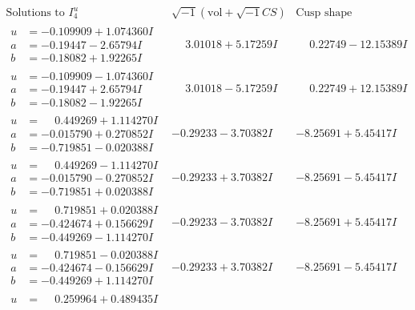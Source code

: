 \documentclass[1p]{elsarticle_modified}
\theoremstyle{definition}
\newcommand{\I}{\sqrt{-1}}
\begin{document}
$$\begin{array}{c|c|c}  
\text{Solutions to }I^u_{4}& \I (\text{vol} + \sqrt{-1}CS) & \text{Cusp shape}\\
 \hline 
\begin{aligned}
u &= -0.109909 + 1.074360 I \\
a &= -0.19447 - 2.65794 I \\
b &= -0.18082 + 1.92265 I\end{aligned}
 & \phantom{-}3.01018 + 5.17259 I & \phantom{-}0.22749 - 12.15389 I \\ \hline\begin{aligned}
u &= -0.109909 - 1.074360 I \\
a &= -0.19447 + 2.65794 I \\
b &= -0.18082 - 1.92265 I\end{aligned}
 & \phantom{-}3.01018 - 5.17259 I & \phantom{-}0.22749 + 12.15389 I \\ \hline\begin{aligned}
u &= \phantom{-}0.449269 + 1.114270 I \\
a &= -0.015790 + 0.270852 I \\
b &= -0.719851 - 0.020388 I\end{aligned}
 & -0.29233 - 3.70382 I & -8.25691 + 5.45417 I \\ \hline\begin{aligned}
u &= \phantom{-}0.449269 - 1.114270 I \\
a &= -0.015790 - 0.270852 I \\
b &= -0.719851 + 0.020388 I\end{aligned}
 & -0.29233 + 3.70382 I & -8.25691 - 5.45417 I \\ \hline\begin{aligned}
u &= \phantom{-}0.719851 + 0.020388 I \\
a &= -0.424674 + 0.156629 I \\
b &= -0.449269 - 1.114270 I\end{aligned}
 & -0.29233 - 3.70382 I & -8.25691 + 5.45417 I \\ \hline\begin{aligned}
u &= \phantom{-}0.719851 - 0.020388 I \\
a &= -0.424674 - 0.156629 I \\
b &= -0.449269 + 1.114270 I\end{aligned}
 & -0.29233 + 3.70382 I & -8.25691 - 5.45417 I \\ \hline\begin{aligned}
u &= \phantom{-}0.259964 + 0.489435 I \\

\end{aligned}
\end{array}$$
\end{document}
